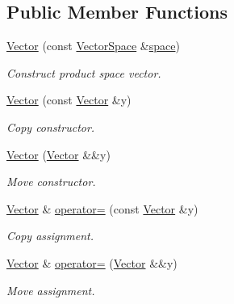 \subsection*{Public Member Functions}
\begin{DoxyCompactItemize}
\item 
\hyperlink{classSpacy_1_1ProductSpace_1_1Vector_a1ca3c013b545d16d761bdba57a7d599b_a1ca3c013b545d16d761bdba57a7d599b}{Vector} (const \hyperlink{classSpacy_1_1VectorSpace}{Vector\+Space} \&\hyperlink{classSpacy_1_1VectorBase_a95e87ce98f5a7646055d4e87e6024044_a95e87ce98f5a7646055d4e87e6024044}{space})
\begin{DoxyCompactList}\small\item\em Construct product space vector. \end{DoxyCompactList}\item 
\hyperlink{classSpacy_1_1ProductSpace_1_1Vector_a30aa574ba2d5ff6fdac5091aca7dbd41_a30aa574ba2d5ff6fdac5091aca7dbd41}{Vector} (const \hyperlink{classSpacy_1_1ProductSpace_1_1Vector}{Vector} \&y)
\begin{DoxyCompactList}\small\item\em Copy constructor. \end{DoxyCompactList}\item 
\hyperlink{classSpacy_1_1ProductSpace_1_1Vector_a5ee29c9ab97bd2506c7bb8993c3c2847_a5ee29c9ab97bd2506c7bb8993c3c2847}{Vector} (\hyperlink{classSpacy_1_1ProductSpace_1_1Vector}{Vector} \&\&y)
\begin{DoxyCompactList}\small\item\em Move constructor. \end{DoxyCompactList}\item 
\hyperlink{classSpacy_1_1ProductSpace_1_1Vector}{Vector} \& \hyperlink{classSpacy_1_1ProductSpace_1_1Vector_a1baac8e505ba5809dca21d76ca7350a3_a1baac8e505ba5809dca21d76ca7350a3}{operator=} (const \hyperlink{classSpacy_1_1ProductSpace_1_1Vector}{Vector} \&y)
\begin{DoxyCompactList}\small\item\em Copy assignment. \end{DoxyCompactList}\item 
\hyperlink{classSpacy_1_1ProductSpace_1_1Vector}{Vector} \& \hyperlink{classSpacy_1_1ProductSpace_1_1Vector_abe92a6e6e34b1925867145fd82665208_abe92a6e6e34b1925867145fd82665208}{operator=} (\hyperlink{classSpacy_1_1ProductSpace_1_1Vector}{Vector} \&\&y)
\begin{DoxyCompactList}\small\item\em Move assignment. \end{DoxyCompactList}\item 

\end{DoxyCompactItemize}
